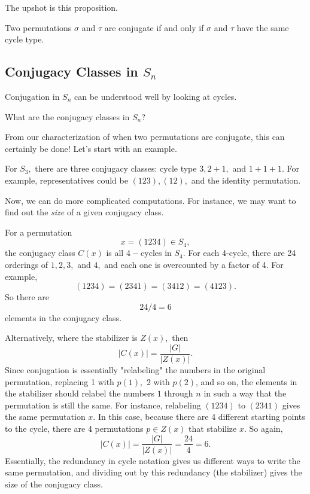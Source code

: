 The upshot is this proposition. 
\begin{proposition}
Two permutations $\sigma$ and $\tau$ are conjugate if and only if $\sigma$ and $\tau$ have the same cycle type.
\end{proposition}

\subsection{Conjugacy Classes in $S_n$}

Conjugation in $S_n$ can be understood well by looking at cycles.

\begin{qq}
What are the conjugacy classes in $S_n$?
\end{qq}

From our characterization of when two permutations are conjugate, this can certainly be done! Let's start with an example.
\begin{example}
For $S_3,$ there are three conjugacy classes: cycle type $3, 2 + 1,$ and $1 + 1 + 1.$ For example, representatives could be $(123), (12),$ and the identity permutation. 
\end{example}

Now, we can do more complicated computations. For instance, we may want to find out the \emph{size} of a given conjugacy class.

\begin{example}
For a permutation \[x = (1234) \in S_4,\] the conjugacy class $C(x)$ is all $4-$cycles in $S_4.$ For each 4-cycle, there are 24 orderings of $1, 2, 3,$ and $4,$ and each one is overcounted by a factor of 4. For example, \[(1234) = (2341) = (3412) = (4123).\] So there are \[24/4 = \boxed{6}\] elements in the conjugacy class. 

Alternatively, where the stabilizer is $Z(x),$ then \[|C(x)| = \frac{|G|}{|Z(x)|}.\] Since conjugation is essentially "relabeling" the numbers in the original permutation, replacing 1 with $p(1),$ 2 with $p(2)$, and so on, the elements in the stabilizer should relabel the numbers $1$ through $n$ in such a way that the permutation is still the same. For instance, relabeling $(1234)$ to $(2341)$ gives the same permutation $x.$ In this case, because there are 4 different starting points to the cycle, there are 4 permutations $p \in Z(x)$ that stabilize $x.$ So again, \[|C(x)| = \frac{|G|}{|Z(x)|} = \frac{24}{4} = 6.\] Essentially, the redundancy in cycle notation gives us different ways to write the same permutation, and dividing out by this redundancy (the stabilizer) gives the size of the conjugacy class.
\end{example}

